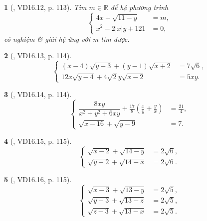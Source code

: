 \documentclass{article}
\newtheorem{baitoan}{}
\begin{document}
\begin{baitoan}[\cite{TLCT_THCS_Toan_9_dai_so}, VD16.12, p. 113]
	Tìm $m\in\mathbb{R}$ để hệ phương trình
	\begin{equation*}
		\left\{\begin{split}
			4x + \sqrt{11 - y} &= m,\\
			x^2 - 2|x|y + 121 &= 0,
		\end{split}\right.
	\end{equation*}
	có nghiệm \& giải hệ ứng với m tìm được.
\end{baitoan}

\begin{baitoan}[\cite{TLCT_THCS_Toan_9_dai_so}, VD16.13, p. 114]
	\begin{equation*}
		\left\{\begin{split}
			(x - 4)\sqrt{y - 3} + (y - 1)\sqrt{x + 2} &= 7\sqrt{6},\\
			12x\sqrt{y - 4} + 4\sqrt{2}y\sqrt{x - 2} &= 5xy.
		\end{split}\right.
	\end{equation*}
\end{baitoan}

\begin{baitoan}[\cite{TLCT_THCS_Toan_9_dai_so}, VD16.14, p. 114]
	\begin{equation*}
		\left\{\begin{split}
			\dfrac{8xy}{x^2 + y^2 + 6xy} + \frac{17}{8}\left(\frac{x}{y} + \frac{y}{x}\right) &= \frac{21}{4},\\
			\sqrt{x - 16} + \sqrt{y - 9} &= 7.
		\end{split}\right.
	\end{equation*}
\end{baitoan}

\begin{baitoan}[\cite{TLCT_THCS_Toan_9_dai_so}, VD16.15, p. 115]
	\begin{equation*}
		\left\{\begin{split}
			\sqrt{x - 2} + \sqrt{14 - y} &= 2\sqrt{6},\\
			\sqrt{y - 2} + \sqrt{14 - x} &= 2\sqrt{6}.
		\end{split}\right.
	\end{equation*}
\end{baitoan}

\begin{baitoan}[\cite{TLCT_THCS_Toan_9_dai_so}, VD16.16, p. 115]
	\begin{equation*}
		\left\{\begin{split}
			\sqrt{x - 3} + \sqrt{13 - y} &= 2\sqrt{5},\\
			\sqrt{y - 3} + \sqrt{13 - z} &= 2\sqrt{5},\\
			\sqrt{z - 3} + \sqrt{13 - x} &= 2\sqrt{5}.
		\end{split}\right.
	\end{equation*}
\end{baitoan}
\end{document}
